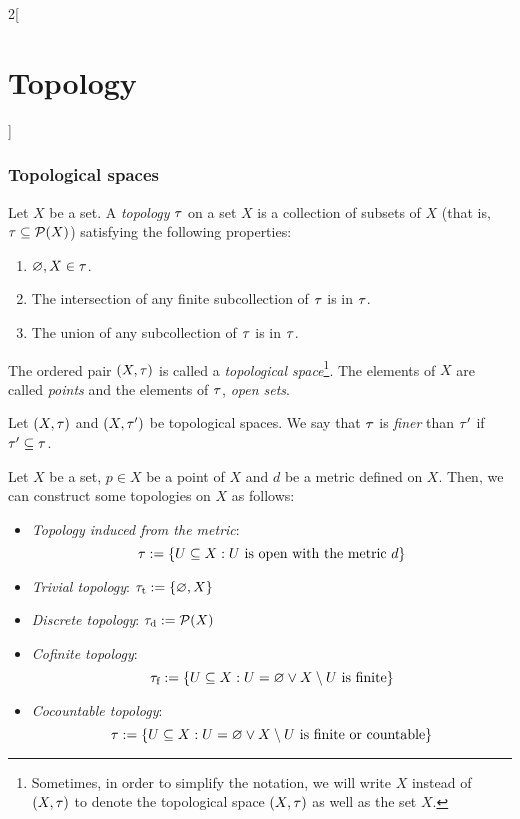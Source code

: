 \documentclass[../../../main_math.tex]{subfiles}
\begin{document}
\begin{multicols}{2}[\section{Topology}]
  \subsubsection{Topological spaces}
  \begin{definition}
    Let $X$ be a set. A \emph{topology} $\tau$ on a set $X$ is a collection of subsets of $X$ (that is, $\tau\subseteq\mathcal{P}(X)$) satisfying the following properties:
    \begin{enumerate}
      \item $\varnothing, X\in\tau$.
      \item The intersection of any finite subcollection of $\tau$ is in $\tau$.
      \item The union of any subcollection of $\tau$ is in $\tau$.
    \end{enumerate}
    The ordered pair $(X,\tau)$ is called a \emph{topological space}\footnote{Sometimes, in order to simplify the notation, we will write $X$ instead of $(X,\tau)$ to denote the topological space $(X,\tau)$ as well as the set $X$.}. The elements of $X$ are called \emph{points} and the elements of $\tau$, \emph{open sets}.
  \end{definition}
  \begin{definition}
    Let $(X,\tau)$ and $(X,\tau')$ be topological spaces. We say that $\tau$ is \emph{finer} than $\tau'$ if $\tau'\subseteq\tau$.
  \end{definition}
  \begin{proposition}
    Let $X$ be a set, $p\in X$ be a point of $X$ and $d$ be a metric defined on $X$. Then, we can construct some topologies on $X$ as follows:
    \begin{itemize}
      \item \emph{Topology induced from the metric}: $$\tau:=\{U\subseteq X:U\text{ is open with the metric }d\}$$
      \item \emph{Trivial topology}: $\tau_\text{t}:=\{\varnothing,X\}$
      \item \emph{Discrete topology}: $\tau_\text{d}:=\mathcal{P}(X)$
      \item \emph{Cofinite topology}: $$\tau_\text{f}:=\{U\subseteq X:U=\varnothing\lor X\setminus U\text{ is finite}\}$$
      \item \emph{Cocountable topology}:
            \begin{equation*}
              \tau:=\{U\subseteq X:U=\varnothing\lor X\setminus U\text{ is finite or countable}\}
            \end{equation*}

\end{itemize}
\end{proposition}
\end{multicols}
\end{document}

